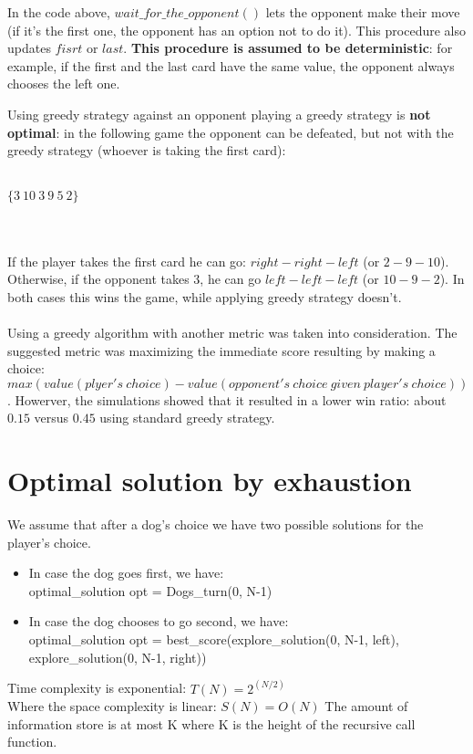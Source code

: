 \documentclass{article}
\begin{document}
In the code above, $wait\_for\_the\_opponent()$ lets the opponent make their move (if it's the first one, the opponent has an option not to do it). This procedure also updates $fisrt$ or $last$. \textbf{This procedure is assumed to be deterministic}: for example, if the first and the last card have the same value, the opponent always chooses the left one.

Using greedy strategy against an opponent playing a greedy strategy is \textbf{not optimal}: in the following game the opponent can be defeated, but not with the greedy strategy (whoever is taking the first card):\\
\\
\centerline{$\{3\ 10\ 3\ 9\ 5\ 2\}$}\\
\\
If the player takes the first card he can go: $right-right-left$ (or $2-9-10$). Otherwise, if the opponent takes $3$, he can go $left-left-left$ (or $10-9-2$). In both cases this wins the game, while applying greedy strategy doesn't.\\
\\
Using a greedy algorithm with another metric was taken into consideration. The suggested metric was maximizing the immediate score resulting by making a choice: $max(value(plyer's\ choice) - value(opponent's\ choice\ given\ player's\ choice))$. Howerver, the simulations showed that it resulted in a lower win ratio: about $0.15$ versus $0.45$ using standard greedy strategy.

\section{Optimal solution by exhaustion}
We assume that after a dog’s choice we have two possible solutions for the player’s choice. 
\begin{itemize}
\item In case the dog goes first, we have:\\
optimal\_solution opt = Dogs\_turn(0, N-1)
\item In case the dog chooses to go second, we have:\\
optimal\_solution opt = best\_score(explore\_solution(0, N-1, left),\\ explore\_solution(0, N-1, right))
\end{itemize}
Time complexity is exponential: $T(N) = 2^{(N/2)}$\\
Where the space complexity is linear: $S(N) = O(N)$ The amount of information store is at most K where K is the height of the recursive call function.
\end{document}
